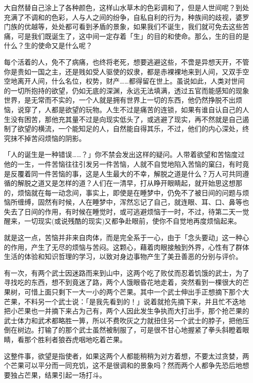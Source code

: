 \documentclass[12pt,twoside,openany]{book}
\begin{document}
大自然替自己涂上了各种颜色，这样山水草木的色彩调和了，但是人世间呢？到处充满了不调和的色彩，人与人之间的纷争，自私自利的行为，种族间的歧视，婆罗门族的优越等，处处都可看到矛盾的景象，如果我们不诞生，我们就可免去这些苦痛，可是我们既诞生了，这中间一定存着「生」的目的和使命。那么，生的目的是什么？生的使命又是什么呢？

每个活着的人，免不了病痛，也终将老死，想要逃避这些，不啻是异想天开，不管你是贵如一国之主，还是贱如受人驱使的奴隶，都是赤裸裸地来到人间，又双手空空地离开人间，什么名位，权势，财产……都得留在世上。虽说如此，人类对世间的一切所抱持的欲望，仍如无底的深渊，永远无法填满，透过五官而能感知的现象世界，是无常而不实的，一个人就是拥有世界上一切的东西，他仍然挣脱不出烦恼，说穿了，人都是欲望的玩物。人生不过是痛苦的连锁，如果有谁自认自己的人生没有困苦，那他充其量不过是向现实低头了，或逃避了现实，再不然就是自己遏制了欲望的横流，一个能知足的人，自然能自得其乐，不过，他们的内心深处，终究抹不掉苦闷烦恼的阴影。

「人的诞生是一种错误……？」你不禁会发出这样的疑问。人带着欲望和苦恼度过他的一生，一件苦恼往往引发另一件苦恼，人就不自觉地陷入苦恼的窠臼，有时竟是反覆着同一件苦恼的事，这是人生最大的不幸，解脱之道是什么？万人可共同遵循的解脱之道又是怎样的道？人们在一清早，打从睁开眼睛起，就开始思这想那的，烦恼就在每一动念间，事实上，即使是在睡梦中，仍免不了被日间的问题与烦恼所缠缚，固然有时候，人在睡梦中，浑然忘记了自己，就连眼、耳、口、鼻等也失去了日间的作用，有时候在睡觉时，或可逃避烦恼于一时，不过，待第二天一觉醒来，一切现实(或说残酷的现实)又都争赴眼前，使你不自觉地再度烦恼起来。

就是这一点，苦恼并非来自肉体，而是完全系于一心，由于「念头要动」这一种心的作用，产生了无尽的烦恼与苦闷。这颗心，藉着肉眼接触到外界，心性有了群体生活的体验和知识哲理的学习，以致对身边事物产生了美丑善恶的分别与评价。

有一次，有两个武士因迷路而来到山中，这两个吃了败仗而忍着饥饿的武士，为了寻找吃的东西，想不到竟迷了路，两个人饿眼昏花地走着，突然看到一棵很大的芒果树，可惜上面只剩下一大一小的两个芒果。其中一个武士伸出手正想摘下那个大芒果，不料另一个武士说：「是我先看到的！」说着就抢先摘下来，并且忙不迭地把小芒果也一并摘下来占为己有，两个人因此发生争执而大打出手，那个抢芒果的武士体力和武术都略胜一箅，所以不费吹灰之力就扭住另一个武士的脖子，把他压倒在树边。打输了的那个武士虽然被制服了，可是很不甘心地握紧了拳头斜瞪着眼睛，看那个胜利者狼吞虎咽地吃着芒果。

这整件事，欲望是指使者，如果这两个人都能稍稍为对方着想，不要太过贪婪，两个芒果可以平分而一同充饥，这不是很调和的景象吗？然而两个人都争先恐后地想要独占芒果，结果引起一场打斗。
\end{document}
